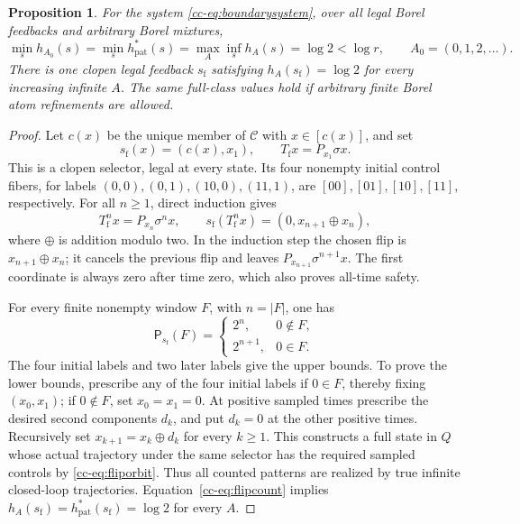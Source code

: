\documentclass[11pt,reqno]{amsart}
\numberwithin{equation}{section}
\newtheorem{proposition}[theorem]{Proposition}
\theoremstyle{definition}
\newcommand{\Patt}{\mathsf P}
\newcommand{\hpat}{h_{\mathrm{pat}}^{*}}
\begin{document}
\begin{proposition}\label{cc-prop:boundary}
For the system \eqref{cc-eq:boundarysystem}, over all legal Borel feedbacks
and arbitrary Borel mixtures,
\begin{equation}\label{cc-eq:boundaryvalue}
 \min_s h_{A_0}(s)=\min_s\hpat(s)=
 \max_A\inf_s h_A(s)=\log2<\log r,
 \qquad A_0=(0,1,2,\ldots).
\end{equation}
There is one clopen legal feedback $s_{\mathrm f}$ satisfying
$h_A(s_{\mathrm f})=\log2$ for every increasing infinite $A$.
The same full-class values hold if arbitrary finite Borel atom
refinements are allowed.
\end{proposition}
\begin{proof}
Let $c(x)$ be the unique member of $\mathcal C$ with $x\in[c(x)]$,
and set
\[
 s_{\mathrm f}(x)=(c(x),x_1),\qquad
 T_{\mathrm f}x=P_{x_1}\sigma x.
\]
This is a clopen selector, legal at every state. Its four nonempty
initial control fibers, for labels $(0,0),(0,1),(10,0),(11,1)$, are
$[00],[01],[10],[11]$, respectively. For all $n\ge1$, direct induction
gives
\begin{equation}\label{cc-eq:fliporbit}
 T_{\mathrm f}^n x=P_{x_n}\sigma^n x,
 \qquad s_{\mathrm f}(T_{\mathrm f}^n x)
        =(0,x_{n+1}\mathbin\oplus x_n),
\end{equation}
where $\oplus$ is addition modulo two. In the induction step the
chosen flip is $x_{n+1}\oplus x_n$; it cancels the previous flip and
leaves $P_{x_{n+1}}\sigma^{n+1}x$. The first coordinate is always zero
after time zero, which also proves all-time safety.

For every finite nonempty window $F$, with $n=|F|$, one has
\begin{equation}\label{cc-eq:flipcount}
 \Patt_{s_{\mathrm f}}(F)=
 \begin{cases}2^n,&0\notin F,\\2^{n+1},&0\in F.\end{cases}
\end{equation}
The four initial labels and two later labels give the upper bounds.
To prove the lower bounds, prescribe any of the four initial labels
if $0\in F$, thereby fixing $(x_0,x_1)$; if $0\notin F$, set
$x_0=x_1=0$. At positive sampled times prescribe the desired second
components $d_k$, and put $d_k=0$ at the other positive times.
Recursively set $x_{k+1}=x_k\oplus d_k$ for every $k\ge1$.
This constructs a full state in $Q$ whose actual trajectory under the
same selector has the required sampled controls by
\eqref{cc-eq:fliporbit}. Thus all counted patterns are realized by true
infinite closed-loop trajectories. Equation~\eqref{cc-eq:flipcount}
implies $h_A(s_{\mathrm f})=\hpat(s_{\mathrm f})=\log2$ for every $A$.


\end{proof}
\end{document}
